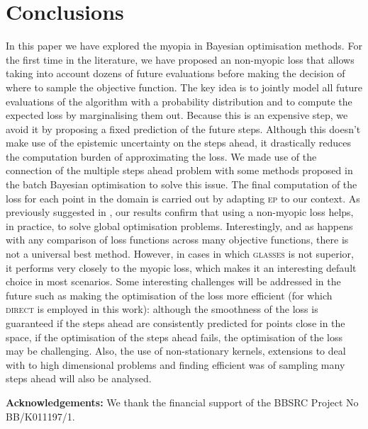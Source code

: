 \documentclass[twoside]{article}
\newcommand{\acr}[1]{\textsc{#1}\xspace}
\newcommand{\us}{\acr{glasses}}
\newcommand{\direct}{\acr{direct}}
\newcommand{\ep}{\acr{ep}}
\begin{document}
\section{Conclusions}\label{sec:conclusions}
\vspace{-0.2cm}
In this paper we have explored the myopia in Bayesian optimisation methods. For the first time in the literature, we have proposed an non-myopic loss that allows taking into account dozens of future evaluations before making the decision of where to sample the objective function. The key idea is to jointly model all future evaluations of the algorithm with a probability distribution and to compute the expected loss by marginalising them out. Because this is an expensive step, we avoid it by proposing a fixed prediction of the future steps. Although this doesn't make use of the epistemic uncertainty on the steps ahead, it drastically reduces the computation burden of approximating the loss. We made use of the connection of the multiple steps ahead problem with some methods proposed in the batch Bayesian optimisation to solve this issue. The final computation of the loss for each point in the domain is carried out by adapting \ep to our context. As previously suggested in \cite{osborne_gaussian_2009}, our results confirm that using a non-myopic loss helps, in practice, to solve global optimisation problems. Interestingly, and as happens with any comparison of loss functions across many objective functions, there is not a universal best method. However, in cases in which \us is not superior, it performs very closely to the myopic loss, which makes it an interesting default choice in most scenarios. Some interesting challenges will be addressed in the future such as making the optimisation of the loss more efficient (for which \direct is employed in this work): although the smoothness of the loss is guaranteed if the steps ahead are consistently predicted for points close in the space, if the optimisation of the steps ahead fails,  the optimisation of the loss may be challenging.  Also, the use of non-stationary kernels, extensions to deal with to high dimensional problems and finding efficient was of sampling many steps ahead will also be analysed.
  
\textbf{Acknowledgements:} We thank  the  financial  support  of  the  BBSRC Project No BB/K011197/1.


\end{document}
